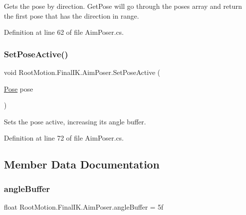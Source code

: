 Gets the pose by direction. Get\+Pose will go through the poses array and return the first pose that has the direction in range. 



Definition at line 62 of file Aim\+Poser.\+cs.

\mbox{\label{class_root_motion_1_1_final_i_k_1_1_aim_poser_a4b925153c05eef6cb1ff51a8c90c8989}} 
\subsubsection{\texorpdfstring{Set\+Pose\+Active()}{SetPoseActive()}}
{\footnotesize\ttfamily void Root\+Motion.\+Final\+I\+K.\+Aim\+Poser.\+Set\+Pose\+Active (\begin{DoxyParamCaption}\item[{\mbox{\hyperlink{class_root_motion_1_1_final_i_k_1_1_aim_poser_1_1_pose}{Pose}}}]{pose }\end{DoxyParamCaption})}



Sets the pose active, increasing it\textquotesingle{}s angle buffer. 



Definition at line 72 of file Aim\+Poser.\+cs.



\subsection{Member Data Documentation}
\mbox{\label{class_root_motion_1_1_final_i_k_1_1_aim_poser_a5b51cba6cf04c2983261e550f1ef7a72}} 
\subsubsection{\texorpdfstring{angle\+Buffer}{angleBuffer}}
{\footnotesize\ttfamily float Root\+Motion.\+Final\+I\+K.\+Aim\+Poser.\+angle\+Buffer = 5f}



